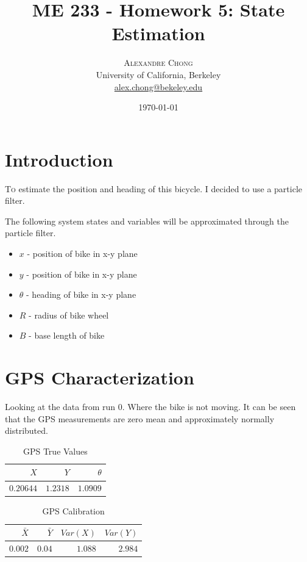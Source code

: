 \documentclass[twoside,twocolumn]{article}
\title{ME 233 - Homework 5: State Estimation} %
\author{%
\textsc{Alexandre Chong} \\[1ex] %
\normalsize University of California, Berkeley \\ %
\normalsize \href{mailto:alex.chong@berkeley.edu}{alex.chong@bekeley.edu} %
}
\date{\today} %
\begin{document}
\maketitle


\section{Introduction}

\lettrine[nindent=0em,lines=3]{T}o estimate the position and heading of this bicycle. I decided to use a particle filter.

The following system states and variables will be approximated through the particle filter.
\begin{itemize}
\item $x$ - position of bike in x-y plane
\item $y$ - position of bike in x-y plane
\item $\theta$ - heading of bike in x-y plane
\item $R$ - radius of bike wheel
\item $B$ - base length of bike
\end{itemize}

\section{GPS Characterization}
Looking at the data from run 0. Where the bike is not moving. It can be seen that the GPS measurements are zero mean and approximately normally distributed.

\begin{table}[h!]
\centering
\caption{GPS True Values}
\label{table:alg1}
\begin{tabular}{rrr}
\hline
$X$ & $Y$ & $\theta$ \\ [0.5ex] 
\hline
$0.20644$ & $1.2318$ & $1.0909$\\
\hline
\end{tabular}
\end{table}

\begin{table}[h!]
\centering
\caption{GPS Calibration}
\label{table:alg1}
\begin{tabular}{rrrr}
\hline
$\bar{X}$ & $\bar{Y}$ & $Var(X)$ & $Var(Y)$\\ [0.5ex] 
\hline
$0.002$ & $0.04$ & $1.088$ & $2.984$\\
\hline
\end{tabular}
\end{table}
\end{document}
